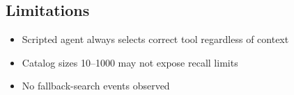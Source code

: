 \subsection{Limitations}
\begin{itemize}
    \item Scripted agent always selects correct tool regardless of context
    \item Catalog sizes 10--1000 may not expose recall limits
    \item No fallback-search events observed
\end{itemize}

